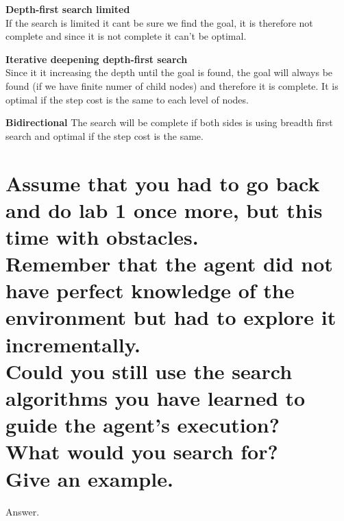 \documentclass{article}
\begin{document}
\textbf{Depth-first search limited}\\
If the search is limited it cant be sure we find the goal, it is therefore not complete and since it is not complete it can't be optimal.

\textbf{Iterative deepening depth-first search}\\
Since it it increasing the depth until the goal is found, the goal will always be found (if we have finite numer of child nodes) and therefore it is complete.
It is optimal if the step cost is the same to each level of nodes. 

\textbf{Bidirectional}
The search will be complete if both sides is using breadth first search and optimal if the step cost is the same. 

\section*{Assume that you had to go back and do lab 1 once more, but this time with obstacles.\\Remember that the agent did not have perfect knowledge of the environment but had to explore it incrementally.\\Could you still use the search algorithms you have learned to guide the agent's execution?\\What would you search for?\\Give an example.}

Answer.
\end{document}
